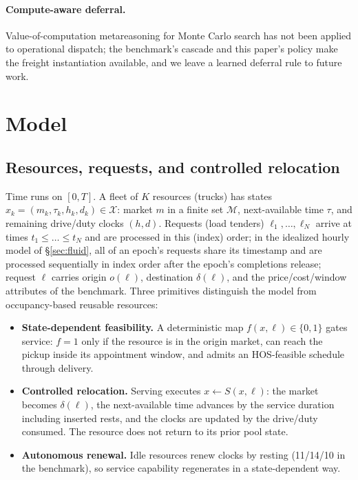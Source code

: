 \documentclass[11pt]{article}
\begin{document}
\paragraph{Compute-aware deferral.} Value-of-computation metareasoning
for Monte Carlo search \citep{sezener2020voc} has not been applied to
operational dispatch; the benchmark's cascade and this paper's policy
make the freight instantiation available, and we leave a learned
deferral rule to future work.

\section{Model}
\label{sec:model}

\subsection{Resources, requests, and controlled relocation}

Time runs on $[0, T]$. A fleet of $K$ resources (trucks) has
states $x_k = (m_k, \tau_k, h_k, d_k) \in \mathcal{X}$: market $m$ in a
finite set $\mathcal{M}$, next-available time $\tau$, and remaining
drive/duty clocks $(h, d)$. Requests (load tenders)
$\ell_1, \dots, \ell_N$ arrive at times $t_1 \leq \dots \leq t_N$
and are processed in this (index) order; in the idealized hourly model
of \S\ref{sec:fluid}, all of an epoch's requests share its timestamp
and are processed sequentially in index order after the epoch's
completions release; request
$\ell$ carries origin $o(\ell)$, destination $\delta(\ell)$, and the
price/cost/window attributes of the benchmark. Three primitives
distinguish the model from occupancy-based reusable resources:

\begin{itemize}
\item \textbf{State-dependent feasibility.} A deterministic map
  $f(x, \ell) \in \{0, 1\}$ gates service: $f = 1$ only if the resource
  is in the origin market, can reach the pickup inside its appointment
  window, and admits an HOS-feasible schedule through delivery.
\item \textbf{Controlled relocation.} Serving executes
  $x \leftarrow S(x, \ell)$: the market becomes $\delta(\ell)$, the
  next-available time advances by the service duration including
  inserted rests, and the clocks are updated by the drive/duty consumed.
  The resource does not return to its prior pool state.
\item \textbf{Autonomous renewal.} Idle resources renew clocks by
  resting (11/14/10 in the benchmark), so service capability regenerates
  in a state-dependent way.
\end{itemize}
\end{document}
